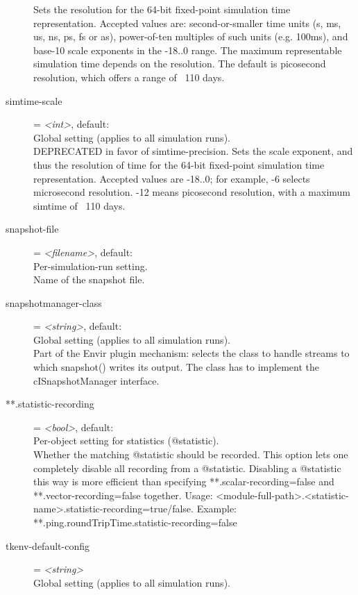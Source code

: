 \begin{description}
    Sets the resolution for the 64-bit fixed-point simulation time
    representation. Accepted values are: second-or-smaller time units (s, ms,
    us, ns, ps, fs or as), power-of-ten multiples of such units (e.g. 100ms),
    and base-10 scale exponents in the -18..0 range. The maximum representable
    simulation time depends on the resolution. The default is picosecond
    resolution, which offers a range of ~110 days.
\item[simtime-scale] = \textit{<int>}, default: \\
    Global setting (applies to all simulation runs).\\
    DEPRECATED in favor of simtime-precision. Sets the scale exponent, and thus
    the resolution of time for the 64-bit fixed-point simulation time
    representation. Accepted values are -18..0; for example, -6 selects
    microsecond resolution. -12 means picosecond resolution, with a maximum
    simtime of ~110 days.
\item[snapshot-file] = \textit{<filename>}, default: \\
    Per-simulation-run setting.\\
    Name of the snapshot file.
\item[snapshotmanager-class] = \textit{<string>}, default: \\
    Global setting (applies to all simulation runs).\\
    Part of the Envir plugin mechanism: selects the class to handle streams to
    which snapshot() writes its output. The class has to implement the
    cISnapshotManager interface.
\item[**.statistic-recording] = \textit{<bool>}, default: \\
    Per-object setting for statistics (@statistic).\\
    Whether the matching @statistic should be recorded. This option lets one
    completely disable all recording from a @statistic. Disabling a @statistic
    this way is more efficient than specifying **.scalar-recording=false and
    **.vector-recording=false together. Usage:
    <module-full-path>.<statistic-name>.statistic-recording=true/false.
    Example: **.ping.roundTripTime.statistic-recording=false
\item[tkenv-default-config] = \textit{<string>}\\
    Global setting (applies to all simulation runs).\\

\end{description}
